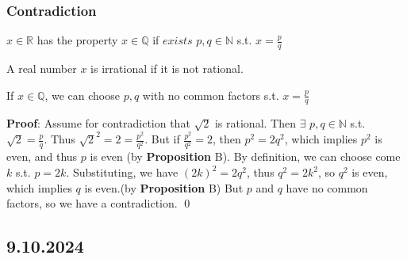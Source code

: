 \documentclass[11pt]{scrartcl}
\begin{document}
\subsubsection{Contradiction}
\begin{definition}[Rationals]
    $x \in \mathbb{R}$ has the property $x \in \mathbb{Q}$ if $exists$ $p, q \in \mathbb{N}$ s.t. $x = \frac{p}{q}$
\end{definition}
\begin{definition}[irrational]
    A real number $x$ is irrational if it is not rational.
\end{definition}
\begin{proposition}[C] If $x\in \mathbb{Q}$, we can choose $p, q$ with no common factors s.t. $x = \frac{p}{q}$\\
\end{proposition}
\begin{theorem}
    \textbf{Proof}: Assume for contradiction that $\sqrt{2}$ is rational.  Then $\exists$ $p, q \in \mathbb{N}$ s.t. $\sqrt{2} = \frac{p}{q}$. Thus $\sqrt{2}^2 = 2 = \frac{p^2}{q^2}$.  But if $\frac{p^2}{q^2} = 2$, then $p^2 = 2 q^2$, which implies $p^2$ is even, and thus $p$ is even (by \textbf{Proposition} B).   By definition, we can choose come $k$ s.t. $p=2k$. Substituting, we have $(2k)^2 = 2q^2$, thus $q^2 = 2k^2$, so $q^2$ is even, which implies $q$ is even.(by \textbf{Proposition} B) But $p$ and $q$ have no common factors, so we have a contradiction. \qed
\end{theorem}
\noindent
\Line

\subsection{9.10.2024}
\end{document}
